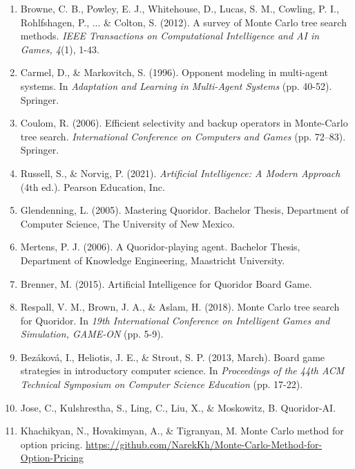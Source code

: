 \documentclass[12pt]{report}
\begin{document}
\begin{enumerate}[label={\arabic*.}, left=0pt, labelsep=10pt]

    \item Browne, C. B., Powley, E. J., Whitehouse, D., Lucas, S. M., Cowling, P. I., Rohlfshagen, P., ... \& Colton, S. (2012). A survey of Monte Carlo tree search methods. \textit{IEEE Transactions on Computational Intelligence and AI in Games, 4}(1), 1-43.

    \item Carmel, D., \& Markovitch, S. (1996). Opponent modeling in multi-agent systems. In \textit{Adaptation and Learning in Multi-Agent Systems} (pp. 40-52). Springer.

    \item Coulom, R. (2006). Efficient selectivity and backup operators in Monte-Carlo tree search. \textit{International Conference on Computers and Games} (pp. 72–83). Springer.

    \item Russell, S., \& Norvig, P. (2021). \textit{Artificial Intelligence: A Modern Approach} (4th ed.). Pearson Education, Inc.

    \item Glendenning, L. (2005). Mastering Quoridor. Bachelor Thesis, Department of Computer Science, The University of New Mexico.

    \item Mertens, P. J. (2006). A Quoridor-playing agent. Bachelor Thesis, Department of Knowledge Engineering, Maastricht University.

    \item Brenner, M. (2015). Artificial Intelligence for Quoridor Board Game.

    \item Respall, V. M., Brown, J. A., \& Aslam, H. (2018). Monte Carlo tree search for Quoridor. In \textit{19th International Conference on Intelligent Games and Simulation, GAME-ON} (pp. 5-9).

    \item Bezáková, I., Heliotis, J. E., \& Strout, S. P. (2013, March). Board game strategies in introductory computer science. In \textit{Proceedings of the 44th ACM Technical Symposium on Computer Science Education} (pp. 17-22).

    \item Jose, C., Kulshrestha, S., Ling, C., Liu, X., \& Moskowitz, B. Quoridor-AI.

    \item Khachikyan, N., Hovakimyan, A., \& Tigranyan, M. Monte Carlo method for option pricing.  \url{https://github.com/NarekKh/Monte-Carlo-Method-for-Option-Pricing}

\end{enumerate}
\end{document}
